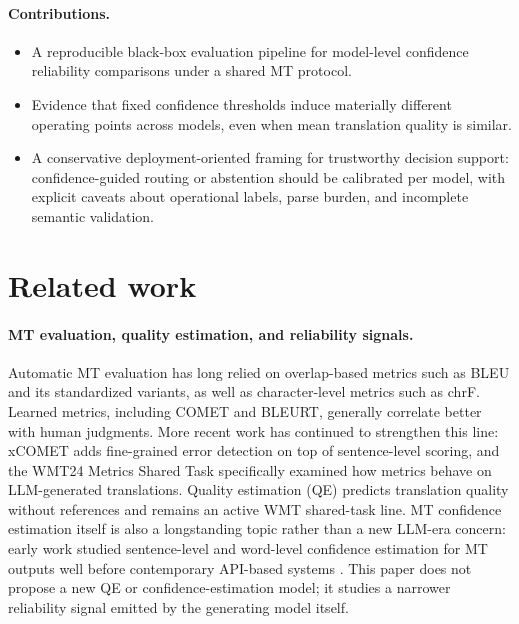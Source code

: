 \documentclass[10pt,conference]{IEEEtran}
\begin{document}
\paragraph{Contributions.}
\begin{itemize}[leftmargin=*]
\item A reproducible black-box evaluation pipeline for model-level confidence reliability comparisons under a shared MT protocol.
\item Evidence that fixed confidence thresholds induce materially different operating points across models, even when mean translation quality is similar.
\item A conservative deployment-oriented framing for trustworthy decision support: confidence-guided routing or abstention should be calibrated per model, with explicit caveats about operational labels, parse burden, and incomplete semantic validation.
\end{itemize}

\section{Related work}

\paragraph{MT evaluation, quality estimation, and reliability signals.}
Automatic MT evaluation has long relied on overlap-based metrics such as BLEU and its standardized variants, as well as character-level metrics such as chrF. Learned metrics, including COMET and BLEURT, generally correlate better with human judgments. More recent work has continued to strengthen this line: xCOMET adds fine-grained error detection on top of sentence-level scoring, and the WMT24 Metrics Shared Task specifically examined how metrics behave on LLM-generated translations. Quality estimation (QE) predicts translation quality without references and remains an active WMT shared-task line. MT confidence estimation itself is also a longstanding topic rather than a new LLM-era concern: early work studied sentence-level and word-level confidence estimation for MT outputs well before contemporary API-based systems \citep{blatz-etal-2004-confidence}. This paper does not propose a new QE or confidence-estimation model; it studies a narrower reliability signal emitted by the generating model itself.
\end{document}
